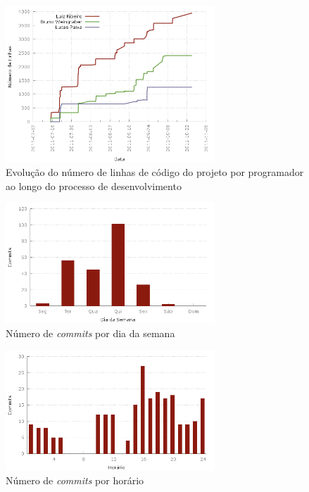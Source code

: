 \begin{figure}[!htb]
	\centering
	\includegraphics[width=0.7\textwidth]{./plots/lines_of_code_by_author.png}
	\caption[Evolução do número de linhas de código por programador]{Evolução do número de linhas de código do projeto por programador ao longo do processo de desenvolvimento}
	\label{fig:linesofcodebyauthor}
\end{figure}

\begin{figure}[!htb]
	\centering
	\includegraphics[width=0.7\textwidth]{./plots/day_of_week.png}
	\caption[Número de \emph{commits} por dia da semana]{Número de \emph{commits} por dia da semana}
	\label{fig:dayofweek}
\end{figure}

\begin{figure}[!htb]
	\centering
	\includegraphics[width=0.7\textwidth]{./plots/hour_of_day.png}
	\caption[Número de \emph{commits} por horário]{Número de \emph{commits} por horário}
	\label{fig:hourofday}
\end{figure}

